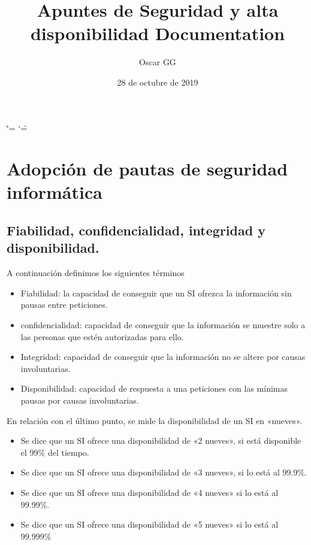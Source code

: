 \documentclass[letterpaper,10pt,spanish]{sphinxmanual}
\title{Apuntes de Seguridad y alta disponibilidad Documentation}
\date{28 de octubre de 2019}
\author{Oscar GG}
\begin{document}
\ifdefined\shorthandoff
  \ifnum\catcode`\=\string=\active\shorthandoff{=}\fi
  \ifnum\catcode`\"=\active{}\fi
\fi

\pagestyle{empty}
\maketitle
\pagestyle{plain}
\sphinxtableofcontents
\pagestyle{normal}
\label{\detokenize{index::doc}}



\chapter{Adopción de pautas de seguridad informática}
\label{\detokenize{tema_pautas_seguridad_informatica/tema_pautas_seguridad_informatica:adopcion-de-pautas-de-seguridad-informatica}}\label{\detokenize{tema_pautas_seguridad_informatica/tema_pautas_seguridad_informatica::doc}}

\section{Fiabilidad, confidencialidad, integridad y disponibilidad.}
\label{\detokenize{tema_pautas_seguridad_informatica/tema_pautas_seguridad_informatica:fiabilidad-confidencialidad-integridad-y-disponibilidad}}
A continuación definimos los siguientes términos
\begin{itemize}
\item {} 
Fiabilidad: la capacidad de conseguir que un SI ofrezca la información sin pausas entre peticiones.

\item {} 
confidencialidad: capacidad de conseguir que la información se muestre solo a las personas que estén autorizadas para ello.

\item {} 
Integridad: capacidad de conseguir que la información no se altere por causas involuntarias.

\item {} 
Disponibilidad: capacidad de respuesta a una peticiones con las mínimas pausas por causas involuntarias.

\end{itemize}

En relación con el último punto, se mide la disponibilidad de un SI en «nueves».
\begin{itemize}
\item {} 
Se dice que un SI ofrece una disponibilidad de «2 nueves», si está disponible el 99\% del tiempo.

\item {} 
Se dice que un SI ofrece una disponibilidad de «3 nueves», si lo está al 99.9\%.

\item {} 
Se dice que un SI ofrece una disponibilidad de «4 nueves» si lo está al 99.99\%.

\item {} 
Se dice que un SI ofrece una disponibilidad de «5 nueves» si lo está al 99.999\%

\end{itemize}
\end{document}
